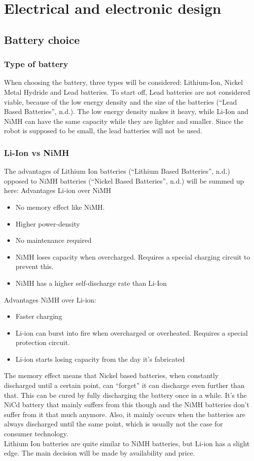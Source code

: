\documentclass[11pt,twoside,a4paper]{report}
\begin{document}
\section{Electrical and electronic design}
\subsection{Battery choice}
\subsubsection{Type of battery}
When choosing the battery, three types will be considered: Lithium-Ion, Nickel Metal Hydride and Lead batteries. To start off, Lead batteries are not considered viable, because of the low energy density and the size of the batteries (“Lead Based Batteries”, n.d.). The low energy density makes it heavy, while Li-Ion and NiMH can have the same capacity while they are lighter and smaller. Since the robot is supposed to be small, the lead batteries will not be used. 
\subsubsection{Li-Ion vs NiMH}
The advantages of Lithium Ion batteries (“Lithium Based Batteries”, n.d.) opposed to NiMH batteries (“Nickel Based Batteries”, n.d.) will be summed up here:
Advantages Li-ion over NiMH
\begin{itemize}
\item No memory effect like NiMH.
\item Higher power-density
\item No maintenance required
\item NiMH loses capacity when overcharged. Requires a special charging circuit to prevent this.
\item NiMH has a higher self-discharge rate than Li-Ion
\end{itemize}
Advantages NiMH over Li-ion:
\begin{itemize}
\item Faster charging
\item Li-ion can burst into fire when overcharged or overheated. Requires a special protection circuit. 
\item Li-ion starts losing capacity from the day it’s fabricated
\end{itemize}
The memory effect means that Nickel based batteries, when constantly discharged until a certain point, can “forget” it can discharge even further than that.  This can be cured by fully discharging the battery once in a while. It’s the NiCd battery that mainly suffers from this though and the NiMH batteries don’t suffer  from it that much anymore. Also, it mainly occurs when the batteries are always discharged until the same point, which is usually not the case for consumer technology.\\ 
Lithium Ion batteries are quite similar to NiMH batteries, but Li-ion has a slight edge. The main decision will be made by availability and price.
\end{document}
